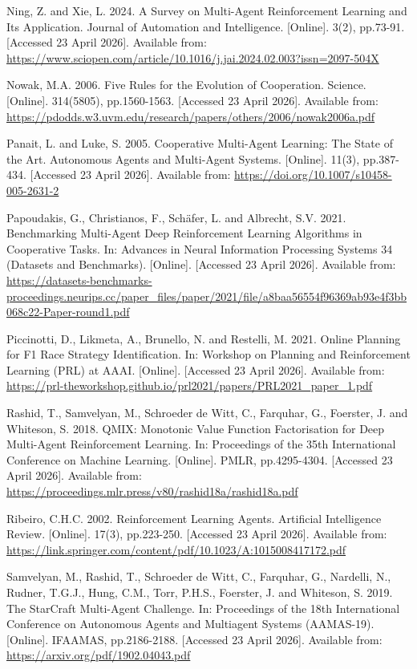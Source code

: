 Ning, Z. and Xie, L. 2024. A Survey on Multi-Agent Reinforcement Learning and Its Application. Journal of Automation and Intelligence. [Online]. 3(2), pp.73-91. [Accessed 23 April 2026]. Available from: \url{https://www.sciopen.com/article/10.1016/j.jai.2024.02.003?issn=2097-504X}

Nowak, M.A. 2006. Five Rules for the Evolution of Cooperation. Science. [Online]. 314(5805), pp.1560-1563. [Accessed 23 April 2026]. Available from: \url{https://pdodds.w3.uvm.edu/research/papers/others/2006/nowak2006a.pdf}

Panait, L. and Luke, S. 2005. Cooperative Multi-Agent Learning: The State of the Art. Autonomous Agents and Multi-Agent Systems. [Online]. 11(3), pp.387-434. [Accessed 23 April 2026]. Available from: \url{https://doi.org/10.1007/s10458-005-2631-2}

Papoudakis, G., Christianos, F., Sch{\"a}fer, L. and Albrecht, S.V. 2021. Benchmarking Multi-Agent Deep Reinforcement Learning Algorithms in Cooperative Tasks. In: Advances in Neural Information Processing Systems 34 (Datasets and Benchmarks). [Online]. [Accessed 23 April 2026]. Available from: \url{https://datasets-benchmarks-proceedings.neurips.cc/paper_files/paper/2021/file/a8baa56554f96369ab93e4f3bb068c22-Paper-round1.pdf}

Piccinotti, D., Likmeta, A., Brunello, N. and Restelli, M. 2021. Online Planning for F1 Race Strategy Identification. In: Workshop on Planning and Reinforcement Learning (PRL) at AAAI. [Online]. [Accessed 23 April 2026]. Available from: \url{https://prl-theworkshop.github.io/prl2021/papers/PRL2021_paper_1.pdf}

Rashid, T., Samvelyan, M., Schroeder de Witt, C., Farquhar, G., Foerster, J. and Whiteson, S. 2018. {QMIX}: Monotonic Value Function Factorisation for Deep Multi-Agent Reinforcement Learning. In: Proceedings of the 35th International Conference on Machine Learning. [Online]. PMLR, pp.4295-4304. [Accessed 23 April 2026]. Available from: \url{https://proceedings.mlr.press/v80/rashid18a/rashid18a.pdf}

Ribeiro, C.H.C. 2002. Reinforcement Learning Agents. Artificial Intelligence Review. [Online]. 17(3), pp.223-250. [Accessed 23 April 2026]. Available from: \url{https://link.springer.com/content/pdf/10.1023/A:1015008417172.pdf}

Samvelyan, M., Rashid, T., Schroeder de Witt, C., Farquhar, G., Nardelli, N., Rudner, T.G.J., Hung, C.M., Torr, P.H.S., Foerster, J. and Whiteson, S. 2019. The {StarCraft} Multi-Agent Challenge. In: Proceedings of the 18th International Conference on Autonomous Agents and Multiagent Systems (AAMAS-19). [Online]. IFAAMAS, pp.2186-2188. [Accessed 23 April 2026]. Available from: \url{https://arxiv.org/pdf/1902.04043.pdf}

